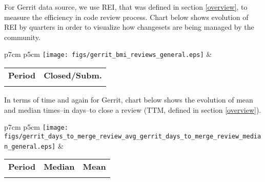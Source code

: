 For Gerrit data source, we use REI, that was defined in section \ref{overview}, to measure the efficiency in code review process. Chart below shows evolution of REI by quarters in order to visualize how changesets are being managed by the community.

\begin{tabular}{p{7cm} p{5cm}}
	\vspace{0pt} 
	\texttt{[image: figs/gerrit\_bmi\_reviews\_general.eps]}
	& 
	\vspace{0pt}
	\begin{tabular}{l|l}%
		\bfseries Period & \bfseries Closed/Subm. %
		\csvreader[head to column names]{data/gerrit_bmi_reviews_general.csv}{}%
		{\\ & \bmireviews}
	\end{tabular}
\end{tabular}

In terms of time and again for Gerrit, chart below shows the evolution of mean and median times--in days--to close a review (TTM, defined in section \ref{overview}).

\begin{tabular}{p{7cm} p{5cm}}
	\vspace{0pt} 
	\texttt{[image: figs/gerrit\_days\_to\_merge\_review\_avg\_gerrit\_days\_to\_merge\_review\_median\_general.eps]}
	& 
	\vspace{0pt}
	\begin{tabular}{l|r|r|}%
		\bfseries Period & \bfseries Median & \bfseries Mean %
		\csvreader[head to column names]{data/gerrit_days_to_merge_review_avg_gerrit_days_to_merge_review_median_general.csv}{}%
		{\\ & \daystomergereviewmedian & \daystomergereviewavg}
	\end{tabular}
\end{tabular}